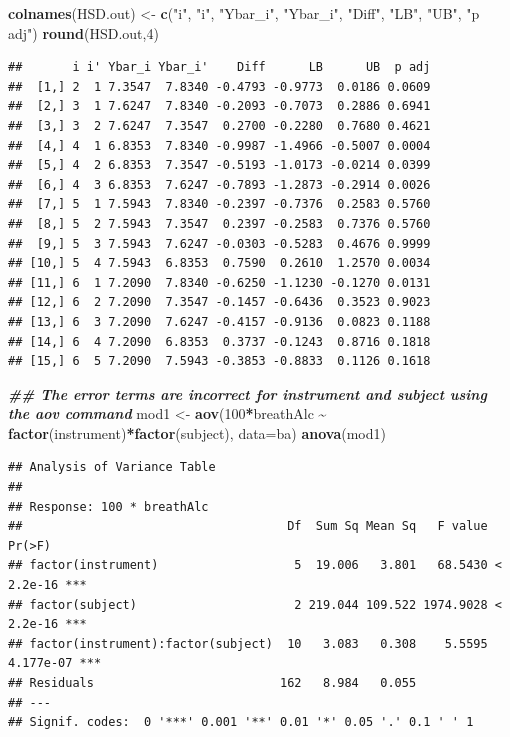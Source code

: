 \documentclass[
]{book}
\newenvironment{Shaded}{\begin{snugshade}}{\end{snugshade}}
\newcommand{\AttributeTok}[1]{\textcolor[rgb]{0.13,0.29,0.53}{#1}}
\newcommand{\DecValTok}[1]{\textcolor[rgb]{0.00,0.00,0.81}{#1}}
\newcommand{\DocumentationTok}[1]{\textcolor[rgb]{0.56,0.35,0.01}{\textbf{\textit{#1}}}}
\newcommand{\FunctionTok}[1]{\textcolor[rgb]{0.13,0.29,0.53}{\textbf{#1}}}
\newcommand{\NormalTok}[1]{#1}
\newcommand{\OtherTok}[1]{\textcolor[rgb]{0.56,0.35,0.01}{#1}}
\newcommand{\SpecialCharTok}[1]{\textcolor[rgb]{0.81,0.36,0.00}{\textbf{#1}}}
\newcommand{\StringTok}[1]{\textcolor[rgb]{0.31,0.60,0.02}{#1}}
\begin{document}
\begin{Shaded}
\begin{Highlighting}[]
\FunctionTok{colnames}\NormalTok{(HSD.out) }\OtherTok{\textless{}{-}} \FunctionTok{c}\NormalTok{(}\StringTok{"i"}\NormalTok{, }\StringTok{"i\textquotesingle{}"}\NormalTok{, }\StringTok{"Ybar\_i"}\NormalTok{, }\StringTok{"Ybar\_i\textquotesingle{}"}\NormalTok{, }\StringTok{"Diff"}\NormalTok{, }\StringTok{"LB"}\NormalTok{, }\StringTok{"UB"}\NormalTok{, }\StringTok{"p adj"}\NormalTok{)}
\FunctionTok{round}\NormalTok{(HSD.out,}\DecValTok{4}\NormalTok{)}
\end{Highlighting}
\end{Shaded}

\begin{verbatim}
##       i i' Ybar_i Ybar_i'    Diff      LB      UB  p adj
##  [1,] 2  1 7.3547  7.8340 -0.4793 -0.9773  0.0186 0.0609
##  [2,] 3  1 7.6247  7.8340 -0.2093 -0.7073  0.2886 0.6941
##  [3,] 3  2 7.6247  7.3547  0.2700 -0.2280  0.7680 0.4621
##  [4,] 4  1 6.8353  7.8340 -0.9987 -1.4966 -0.5007 0.0004
##  [5,] 4  2 6.8353  7.3547 -0.5193 -1.0173 -0.0214 0.0399
##  [6,] 4  3 6.8353  7.6247 -0.7893 -1.2873 -0.2914 0.0026
##  [7,] 5  1 7.5943  7.8340 -0.2397 -0.7376  0.2583 0.5760
##  [8,] 5  2 7.5943  7.3547  0.2397 -0.2583  0.7376 0.5760
##  [9,] 5  3 7.5943  7.6247 -0.0303 -0.5283  0.4676 0.9999
## [10,] 5  4 7.5943  6.8353  0.7590  0.2610  1.2570 0.0034
## [11,] 6  1 7.2090  7.8340 -0.6250 -1.1230 -0.1270 0.0131
## [12,] 6  2 7.2090  7.3547 -0.1457 -0.6436  0.3523 0.9023
## [13,] 6  3 7.2090  7.6247 -0.4157 -0.9136  0.0823 0.1188
## [14,] 6  4 7.2090  6.8353  0.3737 -0.1243  0.8716 0.1818
## [15,] 6  5 7.2090  7.5943 -0.3853 -0.8833  0.1126 0.1618
\end{verbatim}

\begin{Shaded}
\begin{Highlighting}[]
\DocumentationTok{\#\# The error terms are incorrect for instrument and subject using the aov command}
\NormalTok{mod1 }\OtherTok{\textless{}{-}} \FunctionTok{aov}\NormalTok{(}\DecValTok{100}\SpecialCharTok{*}\NormalTok{breathAlc }\SpecialCharTok{\textasciitilde{}} \FunctionTok{factor}\NormalTok{(instrument)}\SpecialCharTok{*}\FunctionTok{factor}\NormalTok{(subject), }\AttributeTok{data=}\NormalTok{ba)}
\FunctionTok{anova}\NormalTok{(mod1)}
\end{Highlighting}
\end{Shaded}

\begin{verbatim}
## Analysis of Variance Table
## 
## Response: 100 * breathAlc
##                                     Df  Sum Sq Mean Sq   F value    Pr(>F)    
## factor(instrument)                   5  19.006   3.801   68.5430 < 2.2e-16 ***
## factor(subject)                      2 219.044 109.522 1974.9028 < 2.2e-16 ***
## factor(instrument):factor(subject)  10   3.083   0.308    5.5595 4.177e-07 ***
## Residuals                          162   8.984   0.055                        
## ---
## Signif. codes:  0 '***' 0.001 '**' 0.01 '*' 0.05 '.' 0.1 ' ' 1
\end{verbatim}
\end{document}
